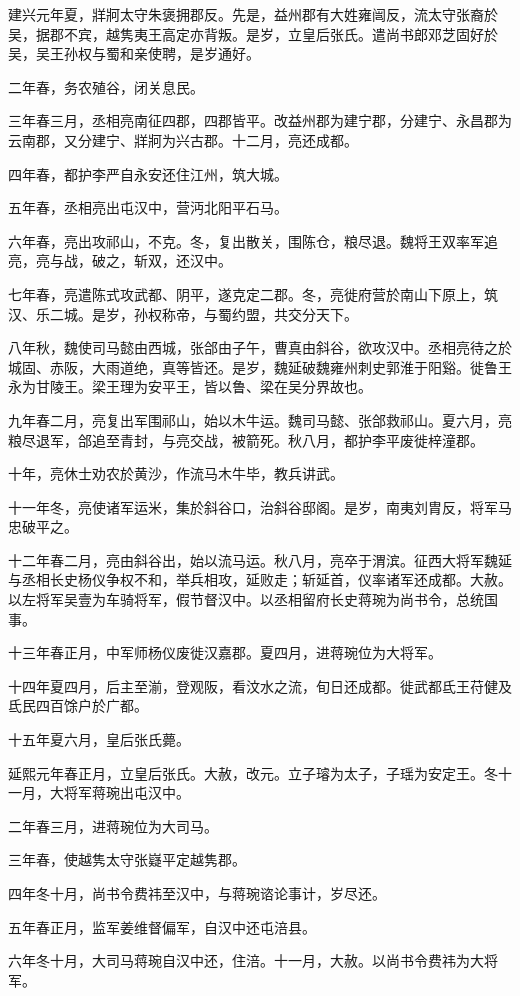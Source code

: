 \documentclass[12pt,UTF8]{ctexbook}
\begin{document}
建兴元年夏，牂牁太守朱褒拥郡反。先是，益州郡有大姓雍闿反，流太守张裔於吴，据郡不宾，越隽夷王高定亦背叛。是岁，立皇后张氏。遣尚书郎邓芝固好於吴，吴王孙权与蜀和亲使聘，是岁通好。

二年春，务农殖谷，闭关息民。

三年春三月，丞相亮南征四郡，四郡皆平。改益州郡为建宁郡，分建宁、永昌郡为云南郡，又分建宁、牂牁为兴古郡。十二月，亮还成都。

四年春，都护李严自永安还住江州，筑大城。

五年春，丞相亮出屯汉中，营沔北阳平石马。

六年春，亮出攻祁山，不克。冬，复出散关，围陈仓，粮尽退。魏将王双率军追亮，亮与战，破之，斩双，还汉中。

七年春，亮遣陈式攻武都、阴平，遂克定二郡。冬，亮徙府营於南山下原上，筑汉、乐二城。是岁，孙权称帝，与蜀约盟，共交分天下。

八年秋，魏使司马懿由西城，张郃由子午，曹真由斜谷，欲攻汉中。丞相亮待之於城固、赤阪，大雨道绝，真等皆还。是岁，魏延破魏雍州刺史郭淮于阳谿。徙鲁王永为甘陵王。梁王理为安平王，皆以鲁、梁在吴分界故也。

九年春二月，亮复出军围祁山，始以木牛运。魏司马懿、张郃救祁山。夏六月，亮粮尽退军，郃追至青封，与亮交战，被箭死。秋八月，都护李平废徙梓潼郡。

十年，亮休士劝农於黄沙，作流马木牛毕，教兵讲武。

十一年冬，亮使诸军运米，集於斜谷口，治斜谷邸阁。是岁，南夷刘胄反，将军马忠破平之。

十二年春二月，亮由斜谷出，始以流马运。秋八月，亮卒于渭滨。征西大将军魏延与丞相长史杨仪争权不和，举兵相攻，延败走；斩延首，仪率诸军还成都。大赦。以左将军吴壹为车骑将军，假节督汉中。以丞相留府长史蒋琬为尚书令，总统国事。

十三年春正月，中军师杨仪废徙汉嘉郡。夏四月，进蒋琬位为大将军。

十四年夏四月，后主至湔，登观阪，看汶水之流，旬日还成都。徙武都氐王苻健及氐民四百馀户於广都。

十五年夏六月，皇后张氏薨。

延熙元年春正月，立皇后张氏。大赦，改元。立子璿为太子，子瑶为安定王。冬十一月，大将军蒋琬出屯汉中。

二年春三月，进蒋琬位为大司马。

三年春，使越隽太守张嶷平定越隽郡。

四年冬十月，尚书令费祎至汉中，与蒋琬谘论事计，岁尽还。

五年春正月，监军姜维督偏军，自汉中还屯涪县。

六年冬十月，大司马蒋琬自汉中还，住涪。十一月，大赦。以尚书令费祎为大将军。
\end{document}
